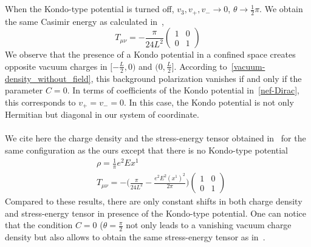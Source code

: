 \\\\
When the Kondo-type potential is turned off, \ie $v_3, v_+, v_- \rightarrow 0$, $\theta \rightarrow \frac 1 2 \pi$.
We obtain the same Casimir energy as calculated in~\cite{Sundberg2003}, \ie
\begin{equation*}
T_{\mu\nu} = -\frac{\pi}{24L^2}\begin{pmatrix} 1 & 0 \\ 0 & 1\end{pmatrix}
\end{equation*}
We observe that the presence of a Kondo potential in a confined space creates opposite vacuum charges in $[-\frac L 2, 0)$ and $(0, \frac L 2]$.
According to~\cref{vacuum-density_without_field}, 
this background polarization vanishes if and only if the parameter $C = 0$. 
In terms of coefficients of the Kondo potential in~\cref{nef-Dirac},
this corresponds to $v_+ = v_- = 0$.
In this case, the Kondo potential is not only Hermitian but diagonal in our system of coordinate. \\\\
%
We cite here the charge density and the stress-energy tensor obtained in~\cite{Zahn2015} for the same configuration as the ours except that there is no Kondo-type potential
\begin{equation*}
\begin{split}
& \rho = \frac 1 \pi e^2 Ex^1 \\
& T_{\mu\nu} = - \big( \frac{\pi}{24L^2} - \frac{e^2 E^2 (x^1)^2}{2\pi}\big) \begin{pmatrix} 1 & 0 \\ 0 & 1 \end{pmatrix}
\end{split}
\end{equation*}
Compared to these results,
there are only constant shifts in both charge density and stress-energy tensor in presence of the Kondo-type potential.
One can notice that the condition $C = 0$ ($\theta = \frac \pi 2$ not only leads to a vanishing vacuum charge density but also allows to obtain the same stress-energy tensor as in~\cite{Zahn2015}.














